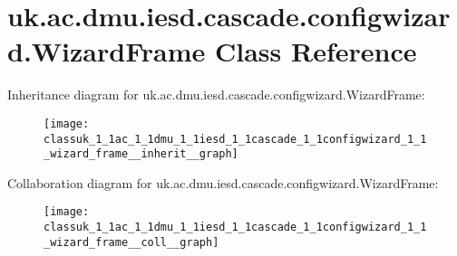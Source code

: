 \hypertarget{classuk_1_1ac_1_1dmu_1_1iesd_1_1cascade_1_1configwizard_1_1_wizard_frame}{\section{uk.\-ac.\-dmu.\-iesd.\-cascade.\-configwizard.\-Wizard\-Frame Class Reference}
\label{classuk_1_1ac_1_1dmu_1_1iesd_1_1cascade_1_1configwizard_1_1_wizard_frame}
}


Inheritance diagram for uk.\-ac.\-dmu.\-iesd.\-cascade.\-configwizard.\-Wizard\-Frame\-:\nopagebreak
\begin{figure}[H]
\begin{center}
\leavevmode
\texttt{[image: classuk\_1\_1ac\_1\_1dmu\_1\_1iesd\_1\_1cascade\_1\_1configwizard\_1\_1\_wizard\_frame\_\_inherit\_\_graph]}
\end{center}
\end{figure}


Collaboration diagram for uk.\-ac.\-dmu.\-iesd.\-cascade.\-configwizard.\-Wizard\-Frame\-:\nopagebreak
\begin{figure}[H]
\begin{center}
\leavevmode
\texttt{[image: classuk\_1\_1ac\_1\_1dmu\_1\_1iesd\_1\_1cascade\_1\_1configwizard\_1\_1\_wizard\_frame\_\_coll\_\_graph]}
\end{center}
\end{figure}
